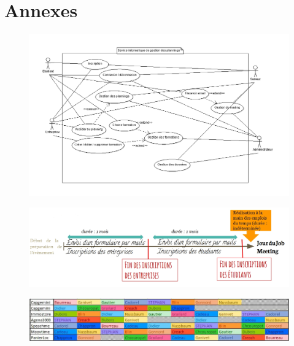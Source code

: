\documentclass[12pt,a4paper]{article}
\begin{document}
\appendix
\vfill
\section{Annexes}

\begin{figure}
  \includegraphics[scale=0.68]{CasUtilisation.png}
\end{figure}

\begin{figure}
  \includegraphics[scale=0.68]{figure2(2_2).jpg}
\end{figure}

\begin{figure}
  \includegraphics[scale=0.68]{figure3(2_3).jpg}
\end{figure}
\end{document}
